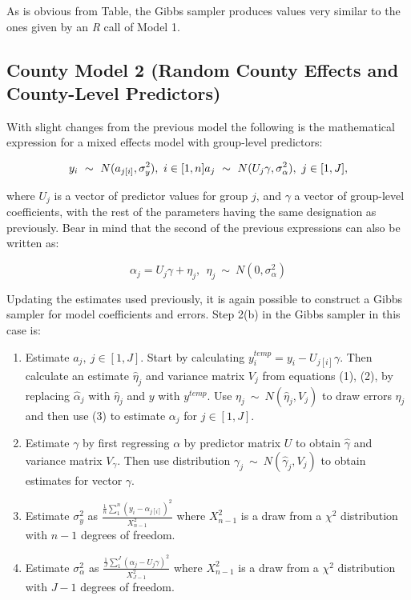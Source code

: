 \documentclass[12pt,twoside]{reedthesis}
\begin{document}
  As is obvious from Table, the Gibbs sampler produces values very similar
  to the ones given by an \textit{R} call of Model 1.
  
  \subsection{County Model 2 (Random County Effects and County-Level
  Predictors)}\label{county-model-2-random-county-effects-and-county-level-predictors}
  
  With slight changes from the previous model the following is the
  mathematical expression for a mixed effects model with group-level
  predictors:
  
  \[y_i \ \sim \ N(a_{j[i]}, \sigma^2_y),\ i \in [1, n] \\ a_j \ \sim \ N(U_j\gamma, \sigma^2_{\alpha}), \ j \in [1,J], \]
  
  where \(U_j\) is a vector of predictor values for group \(j\), and
  \(\gamma\) a vector of group-level coefficients, with the rest of the
  parameters having the same designation as previously. Bear in mind that
  the second of the previous expressions can also be written as:
  
  \begin{equation}
  \alpha_j = U_j\gamma + \eta_j, \ \ \eta_j \ \sim \ N(0, \sigma_{\alpha}^2)
  \end{equation}
  
  Updating the estimates used previously, it is again possible to
  construct a Gibbs sampler for model coefficients and errors. Step 2(b)
  in the Gibbs sampler in this case is:
  
  \begin{enumerate}
    \item Estimate $a_j, \ j\in[1,J]$. Start by calculating $y_i^{temp} = y_i - U_{j[i]}\gamma$. Then calculate an estimate $\hat\eta_j$ and variance matrix $V_j$ from equations (1), (2), by replacing $\hat\alpha_j$ with $\hat\eta_j$ and $y$ with $y^{temp}$. Use $\eta_j \ \sim \ N(\hat\eta_j, V_j)$ to draw errors $\eta_j$ and then use (3) to estimate $\alpha_j$ for $j \in [1,J]$.
    \item Estimate $\gamma$ by first regressing $\alpha$ by predictor matrix $U$ to obtain $\hat\gamma$ and variance matrix $V_{\gamma}$. Then use distribution $\gamma_j \ \sim \ N(\hat\gamma_j, V_j)$ to obtain estimates for vector $\gamma$.
    \item Estimate $\sigma_y^2$ as $\frac{\frac{1}{n}\sum_{1}^{n}(y_i - \alpha_{j[i]})^2}{X_{n-1}^2}$ where $X_{n-1}^2$ is a draw from a $\chi^2$ distribution with $n-1$ degrees of freedom.
    \item Estimate $\sigma_{\alpha}^2$ as $\frac{\frac{1}{J}\sum_{1}^{J}(\alpha_j - U_j\gamma)^2}{X_{J-1}^2}$ where $X_{n-1}^2$ is a draw from a $\chi^2$ distribution with $J-1$ degrees of freedom.
  \end{enumerate}
  
\end{document}
